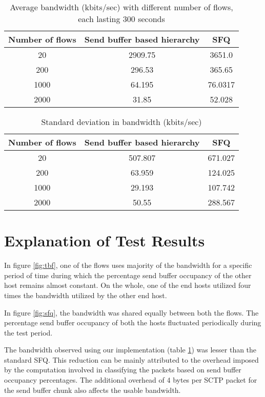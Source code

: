 \begin{table}[h]
  \centering
  \begin{tabular}{|c | c | c|}
    \hline
    Number of flows & Send buffer based hierarchy & SFQ \\ \hline
    20 & 2909.75 & 3651.0 \\
    200 & 296.53 & 365.65 \\
    1000 & 64.195 & 76.0317 \\
    2000 & 31.85 & 52.028 \\ \hline
  \end{tabular}
  \caption{Average bandwidth (kbits/sec) with different number of flows, each
    lasting 300 seconds}
  \label{table:1}
\end{table}

\begin{table}[h]
  \centering
  \begin{tabular}{|c | c | c|}
    \hline
    Number of flows & Send buffer based hierarchy & SFQ \\ \hline
    20 & 507.807 & 671.027 \\
    200 & 63.959 & 124.025 \\
    1000 & 29.193 & 107.742 \\
    2000 & 50.55 & 288.567 \\ \hline
  \end{tabular}
  \caption{Standard deviation in bandwidth (kbits/sec)}
  \label{table:2}
\end{table}

\clearpage

\section{Explanation of Test Results}
In figure \ref{fig:tbf}, one of the flows uses majority of the bandwidth for a
specific period of time during which the percentage send buffer occupancy of
the other host remains almost constant. On the whole, one of the end hosts
utilized four times the bandwidth utilized by the other end host.

In figure \ref{fig:sfq}, the bandwidth was shared equally between both the
flows. The percentage send buffer occupancy of both the hosts fluctuated
periodically during the test period.

The bandwidth observed using our implementation (table \ref{table:1}) was lesser than
the standard SFQ. This reduction can be mainly attributed to the overhead imposed by
the computation involved in classifying the packets based on send buffer
occupancy percentages. The additional overhead of 4 bytes per SCTP packet for
the send buffer chunk also affects the usable bandwidth.

